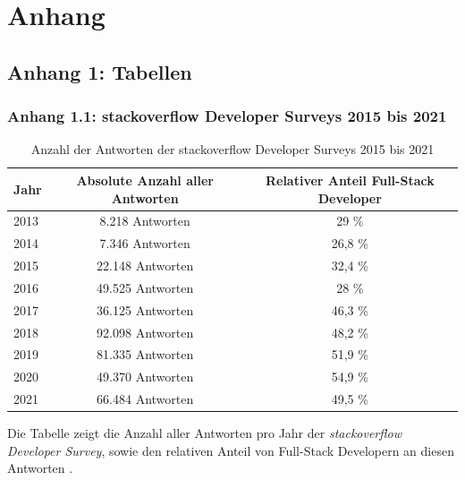 \documentclass[a4paper]{scrartcl}
\begin{document}

\newpage

\appendix

\section*{Anhang}

\subsection*{Anhang 1: Tabellen}

\subsubsection*{Anhang 1.1: stackoverflow Developer Surveys 2015 bis 2021}

\begin{table}[H]
	\centering
	\caption{Anzahl der Antworten der stackoverflow Developer Surveys 2015 bis 2021}
	\begin{center}
		\begin{tabular}{| l | c | c |}
			\hline
			Jahr & Absolute Anzahl aller Antworten & Relativer Anteil Full-Stack Developer \\
			\hline \hline
			2013 & 8.218 Antworten & 29 \% \\
			\hline
			2014 & 7.346 Antworten & 26,8 \% \\
			\hline
			2015 & 22.148 Antworten & 32,4 \% \\
			\hline 
			2016 & 49.525 Antworten & 28 \% \\
			\hline 
			2017 & 36.125 Antworten & 46,3 \% \\
			\hline 
			2018 & 92.098 Antworten & 48,2 \% \\
			\hline
			2019 & 81.335 Antworten & 51,9 \% \\
			\hline
			2020 & 49.370 Antworten & 54,9 \% \\
			\hline
			2021 & 66.484 Antworten & 49,5 \% \\
			\hline
		\end{tabular}
	\end{center}
	Die Tabelle zeigt die Anzahl aller Antworten pro Jahr der \textit{stackoverflow Developer Survey}, sowie den relativen Anteil von Full-Stack Developern an diesen Antworten \autocite{stackoverflow_2015,stackoverflow_2016,stackoverflow_2017,stackoverflow_2018,stackoverflow_2019,stackoverflow_2020,stackoverflow_2021}.
\end{table}
\end{document}
